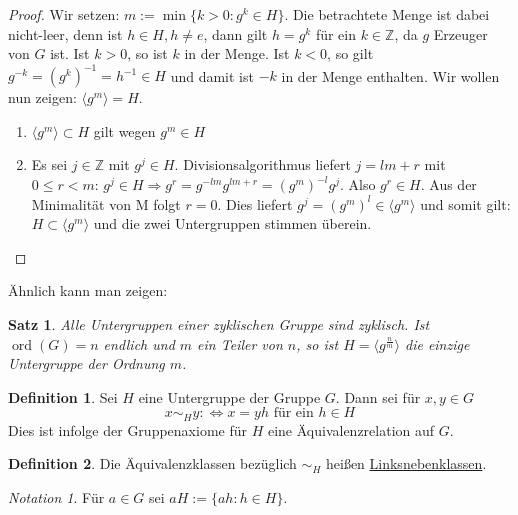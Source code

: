 \documentclass[12pt]{scrartcl} %
\DeclareMathOperator{\ord}{ord}
\newcommand{\inv}[1]{\left(#1\right)^{-1}}
\newcommand{\Inv}[1]{#1^{-1}}
\newtheorem{thm}{Satz}
\theoremstyle{definition}
\newtheorem*{defn}{Definition}
\theoremstyle{remark}
\newtheorem*{notation}{Notation}
\begin{document}
\begin{proof}
	Wir setzen: $m := \min\lbrace k>0 : g^{k} \in H \rbrace$.
	Die betrachtete Menge ist dabei nicht-leer, denn ist $h \in H, h \neq e$, dann gilt $h = g^{k}$ für ein $k\in\mathbb{Z}$, da $g$ Erzeuger von $G$ ist.
	Ist $k>0$, so ist $k$ in der Menge.
	Ist $k<0$, so gilt $g^{-k}=\inv{{g^k}}=\Inv{h}\in H$ und damit ist $-k$ in der Menge enthalten.
	Wir wollen nun zeigen: $\langle g^{m} \rangle = H$.
	\begin{enumerate}
	\item $\langle g^{m} \rangle \subset H$ gilt wegen $g^{m} \in H$
	\item Es sei $j \in \mathbb{Z}$ mit $g^{j} \in H$. Divisionsalgorithmus liefert $j=lm+r$ mit $0 \leq r < m$: $g^{j} \in H \Rightarrow g^{r}=g^{-lm}g^{lm+r}=(g^{m})^{-l}g^{j}$. Also $g^{r} \in H$. Aus der Minimalität von M folgt $r=0$. Dies liefert $g^{j}=(g^{m})^{l} \in \langle g^{m} \rangle$ und somit gilt: $H \subset \langle g^{m} \rangle$ und die zwei Untergruppen stimmen überein. \qedhere
	\end{enumerate}
\end{proof}

Ähnlich kann man zeigen:

\begin{thm} %
	Alle Untergruppen einer zyklischen Gruppe sind zyklisch.
	Ist $\ord(G)=n$ endlich und $m$ ein Teiler von $n$, so ist $H = \langle g^{\frac{n}{m}}\rangle$ die einzige Untergruppe der Ordnung $m$.
\end{thm}

\begin{defn}
	Sei $H$ eine Untergruppe der Gruppe $G$.
	Dann sei für \(x, y \in G\) \[x \sim_{H} y :\Leftrightarrow \text{\(x = yh\) für ein \(h \in H\)}\]
	Dies ist infolge der Gruppenaxiome für \(H\) eine Äquivalenzrelation auf \(G\).
\end{defn}

\begin{defn}
	Die Äquivalenzklassen bezüglich $\sim_{H}$ heißen \underline{Linksnebenklassen}.
\end{defn}

\begin{notation}
	Für $a \in G$ sei $aH := \{ah : h \in H\}$.
\end{notation}
\end{document}
